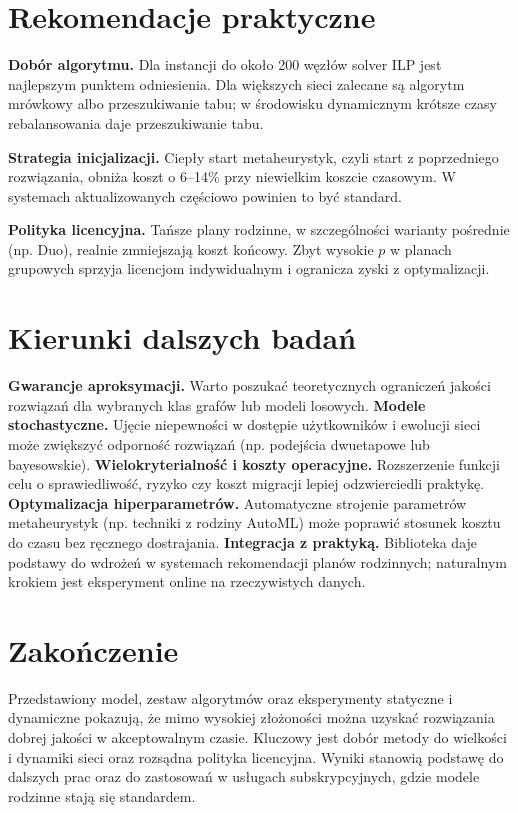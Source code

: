 \section{Rekomendacje praktyczne}

\textbf{Dobór algorytmu.} Dla instancji do około 200 węzłów solver ILP jest najlepszym punktem odniesienia. Dla większych sieci zalecane są algorytm mrówkowy albo przeszukiwanie tabu; w środowisku dynamicznym krótsze czasy rebalansowania daje przeszukiwanie tabu.

\textbf{Strategia inicjalizacji.} Ciepły start metaheurystyk, czyli start z poprzedniego rozwiązania, obniża koszt o 6--14\% przy niewielkim koszcie czasowym. W systemach aktualizowanych częściowo powinien to być standard.

\textbf{Polityka licencyjna.} Tańsze plany rodzinne, w szczególności warianty pośrednie (np. Duo), realnie zmniejszają koszt końcowy. Zbyt wysokie $p$ w planach grupowych sprzyja licencjom indywidualnym i ogranicza zyski z optymalizacji.

\section{Kierunki dalszych badań}

\textbf{Gwarancje aproksymacji.} Warto poszukać teoretycznych ograniczeń jakości rozwiązań dla wybranych klas grafów lub modeli losowych.
\textbf{Modele stochastyczne.} Ujęcie niepewności w dostępie użytkowników i ewolucji sieci może zwiększyć odporność rozwiązań (np. podejścia dwuetapowe lub bayesowskie).
\textbf{Wielokryterialność i koszty operacyjne.} Rozszerzenie funkcji celu o sprawiedliwość, ryzyko czy koszt migracji lepiej odzwierciedli praktykę.
\textbf{Optymalizacja hiperparametrów.} Automatyczne strojenie parametrów metaheurystyk (np. techniki z rodziny AutoML) może poprawić stosunek kosztu do czasu bez ręcznego dostrajania.
\textbf{Integracja z praktyką.} Biblioteka daje podstawy do wdrożeń w systemach rekomendacji planów rodzinnych; naturalnym krokiem jest eksperyment online na rzeczywistych danych.

\section{Zakończenie}

Przedstawiony model, zestaw algorytmów oraz eksperymenty statyczne i dynamiczne pokazują, że mimo wysokiej złożoności można uzyskać rozwiązania dobrej jakości w akceptowalnym czasie. Kluczowy jest dobór metody do wielkości i dynamiki sieci oraz rozsądna polityka licencyjna. Wyniki stanowią podstawę do dalszych prac oraz do zastosowań w usługach subskrypcyjnych, gdzie modele rodzinne stają się standardem.

